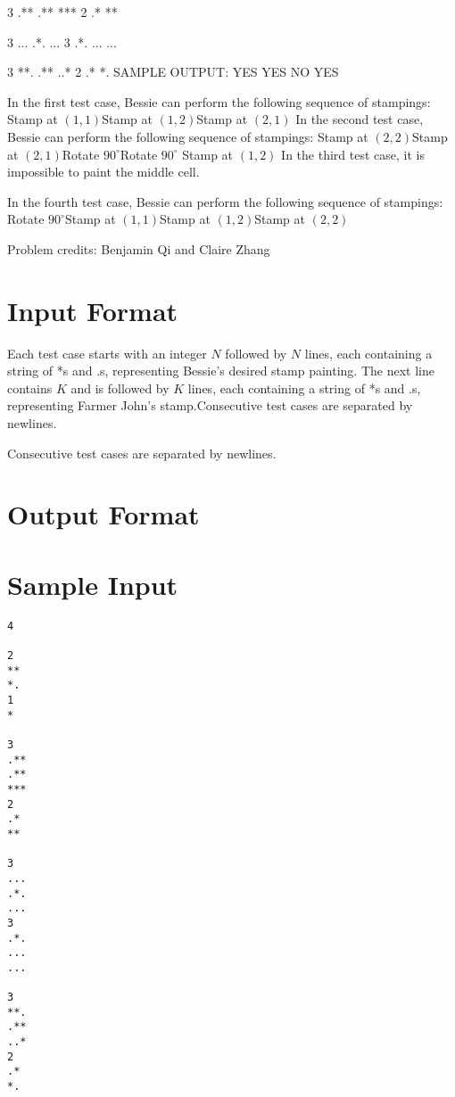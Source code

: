 \documentclass[12pt]{article}
\begin{document}
3
.**
.**
***
2
.*
**

3
...
.*.
...
3
.*.
...
...

3
**.
.**
..*
2
.*
*.
SAMPLE OUTPUT: 
YES
YES
NO
YES

In the first test case, Bessie can perform the following sequence of stampings:
Stamp at $(1,1)$Stamp at $(1,2)$Stamp at $(2,1)$
In the second test case, Bessie can perform the following sequence of stampings:
Stamp at $(2,2)$Stamp at $(2,1)$Rotate
$90^{\circ}$Rotate $90^{\circ}$ Stamp at $(1,2)$
In the third test case, it is impossible to paint the middle cell.

In the fourth test case, Bessie can perform the following sequence of stampings:
Rotate $90^{\circ}$Stamp at $(1,1)$Stamp at
$(1,2)$Stamp at $(2,2)$

Problem credits: Benjamin Qi and Claire Zhang



\section*{Input Format}
Each test case starts with an integer $N$ followed by $N$ lines, each containing
a string of *s and .s, representing Bessie's desired stamp painting. The next
line contains $K$ and is followed by $K$ lines, each containing a string of *s
and .s, representing Farmer John's stamp.Consecutive test cases are separated by newlines.

Consecutive test cases are separated by newlines.

\section*{Output Format}


\section*{Sample Input}
\begin{verbatim}
4

2
**
*.
1
*

3
.**
.**
***
2
.*
**

3
...
.*.
...
3
.*.
...
...

3
**.
.**
..*
2
.*
*.
\end{verbatim}
\end{document}

